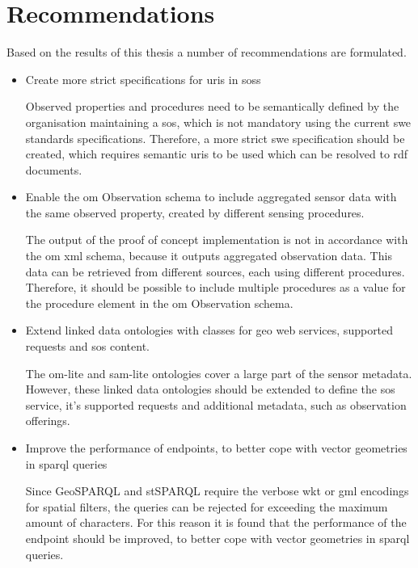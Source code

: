 \section{Recommendations}

Based on the results of this thesis a number of recommendations are formulated. 

\begin{itemize}
	\item Create more strict specifications for \acp{uri} in \aclp{sos}
	
	Observed properties and procedures need to be semantically defined by the organisation maintaining a \ac{sos}, which is not mandatory using the current \ac{swe} standards specifications. Therefore, a more strict \ac{swe} specification should be created, which requires semantic \acp{uri} to be used which can be resolved to \ac{rdf} documents. 
	
	\item Enable the \ac{om} Observation schema to include aggregated sensor data with the same observed property, created by different sensing procedures. 
	
	The output of the proof of concept implementation is not in accordance with the \ac{om} \ac{xml} schema, because it outputs aggregated observation data. This data can be retrieved from different sources, each using different procedures. Therefore, it should be possible to include multiple procedures as a value for the procedure element in the \ac{om} Observation schema.   
	
	\item Extend linked data ontologies with classes for geo web services, supported requests and \ac{sos} content.
	
	The om-lite and sam-lite ontologies cover a large part of the sensor metadata. However, these linked data ontologies should be extended to define the \ac{sos} service, it's supported requests and additional metadata, such as observation offerings. 
	
	\item Improve the performance of endpoints, to better cope with vector geometries in \ac{sparql} queries
	
	Since GeoSPARQL and stSPARQL require the verbose \ac{wkt} or \ac{gml} encodings for spatial filters, the queries can be rejected for exceeding the maximum amount of characters. For this reason it is found that the performance of the endpoint should be improved, to better cope with vector geometries in \ac{sparql} queries. 
	
\end{itemize}




